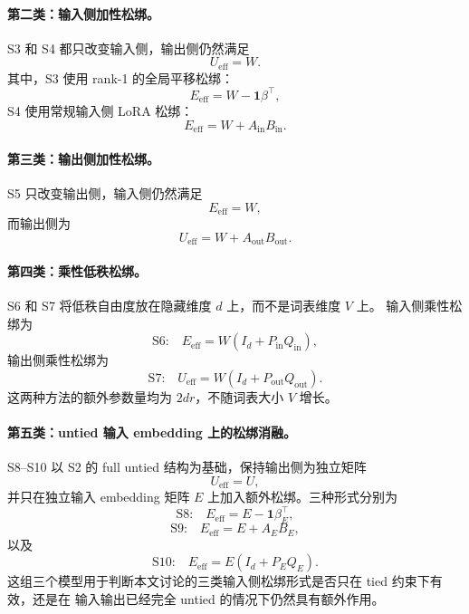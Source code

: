 \paragraph{第二类：输入侧加性松绑。}
S3 和 S4 都只改变输入侧，输出侧仍然满足
\begin{equation}
    U_{\mathrm{eff}} = W.
\end{equation}
其中，S3 使用 rank-1 的全局平移松绑：
\begin{equation}
    E_{\mathrm{eff}} = W-\mathbf{1}\beta^\top,
\end{equation}
S4 使用常规输入侧 LoRA 松绑：
\begin{equation}
    E_{\mathrm{eff}} = W+A_{\mathrm{in}}B_{\mathrm{in}}.
\end{equation}

\paragraph{第三类：输出侧加性松绑。}
S5 只改变输出侧，输入侧仍然满足
\begin{equation}
    E_{\mathrm{eff}} = W,
\end{equation}
而输出侧为
\begin{equation}
    U_{\mathrm{eff}} = W+A_{\mathrm{out}}B_{\mathrm{out}}.
\end{equation}

\paragraph{第四类：乘性低秩松绑。}
S6 和 S7 将低秩自由度放在隐藏维度 $d$ 上，而不是词表维度 $V$ 上。
输入侧乘性松绑为
\begin{equation}
    \text{S6:}\quad
    E_{\mathrm{eff}} = W(I_d+P_{\mathrm{in}}Q_{\mathrm{in}}),
\end{equation}
输出侧乘性松绑为
\begin{equation}
    \text{S7:}\quad
    U_{\mathrm{eff}} = W(I_d+P_{\mathrm{out}}Q_{\mathrm{out}}).
\end{equation}
这两种方法的额外参数量均为 $2dr$，不随词表大小 $V$ 增长。

\paragraph{第五类：untied 输入 embedding 上的松绑消融。}
S8--S10 以 S2 的 full untied 结构为基础，保持输出侧为独立矩阵
\begin{equation}
    U_{\mathrm{eff}} = U,
\end{equation}
并只在独立输入 embedding 矩阵 $E$ 上加入额外松绑。三种形式分别为
\begin{equation}
    \text{S8:}\quad
    E_{\mathrm{eff}} = E-\mathbf{1}\beta_E^\top,
\end{equation}
\begin{equation}
    \text{S9:}\quad
    E_{\mathrm{eff}} = E+A_EB_E,
\end{equation}
以及
\begin{equation}
    \text{S10:}\quad
    E_{\mathrm{eff}} = E(I_d+P_EQ_E).
\end{equation}
这组三个模型用于判断本文讨论的三类输入侧松绑形式是否只在 tied 约束下有效，还是在
输入输出已经完全 untied 的情况下仍然具有额外作用。

